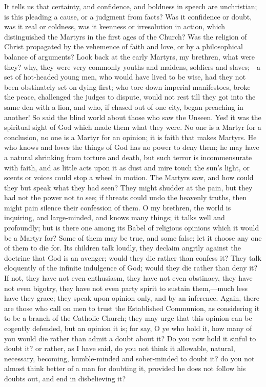 It tells us that certainty, and confidence, and boldness in speech
are unchristian; is this pleading a cause, or a judgment from facts?
Was it confidence or doubt, was it zeal or coldness, was it keenness
or irresolution in action, which distinguished the Martyrs in the
first ages of the Church? Was the religion of Christ propagated by the
vehemence of faith and love, or by a philosophical balance of
arguments? Look back at the early Martyrs, my brethren, what were
they? why, they were very commonly youths and maidens, soldiers and
slaves;—a set of hot-headed young men, who would have lived to be
wise, had they not been obstinately set on dying first; who tore down
imperial manifestoes, broke the peace, challenged the judges to
dispute, would not rest till they got into the same den with a lion,
and who, if chased out of one city, began preaching in another! So
said the blind world about those who saw the Unseen. Yes! it was the
spiritual sight of God which made them what they were. No one is a
Martyr for a conclusion, no one is a Martyr for an opinion; it is
faith that makes Martyrs. He who knows and loves the things of God has
no power to deny them; he may have a natural shrinking from torture
and death, but such terror is incommensurate with faith, and as little
acts upon it as dust and mire touch the sun's light, or scents or
voices could stop a wheel in motion. The Martyrs saw, and how could
they but speak what they had seen? They might shudder at the pain, but
they had not the power not to see; if threats could undo the heavenly
truths, then might pain silence their confession of them. O my
brethren, the world is inquiring, and large-minded, and knows many
things; it talks well and profoundly; but is there one among its Babel
of religious opinions which it would be a Martyr for? Some of them may
be true, and some false; let it choose any one of them to die for. Its
children talk loudly, they declaim angrily against the doctrine that
God is an avenger; would they die rather than confess it? They talk
eloquently of the infinite indulgence of God; would they die rather
than deny it? If not, they have not even enthusiasm, they have not
even obstinacy, they have not even bigotry, they have not even party
spirit to sustain them,—much less have they grace; they speak upon
opinion only, and by an inference. Again, there are those who call on
men to trust the Established Communion, as considering it to be a
branch of the Catholic Church; they may urge that this opinion can be
cogently defended, but an opinion it is; for say, O ye who hold it,
how many of you would die rather than admit a doubt about it? Do you
now hold it sinful to doubt it? or rather, as I have said, do you not
think it allowable, natural, necessary, becoming, humble-minded and
sober-minded to doubt it? do you not almost think better of a man for
doubting it, provided he does not follow his doubts out, and end in
disbelieving it?

